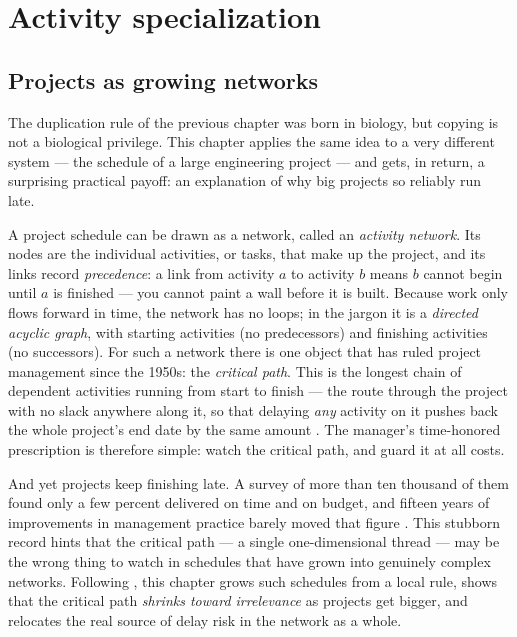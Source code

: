 \chapter{Activity specialization}
\label{ch:projects}

\section{Projects as growing networks}

The duplication rule of the previous chapter was born in biology, but copying is
not a biological privilege. This chapter applies the same idea to a very
different system --- the schedule of a large engineering project --- and gets, in
return, a surprising practical payoff: an explanation of why big projects so
reliably run late.

A project schedule can be drawn as a network, called an \emph{activity network}.
Its nodes are the individual activities, or tasks, that make up the project, and
its links record \emph{precedence}: a link from activity $a$ to activity $b$
means $b$ cannot begin until $a$ is finished --- you cannot paint a wall before it
is built. Because work only flows forward in time, the network has no loops; in
the jargon it is a \emph{directed acyclic graph}, with starting activities (no
predecessors) and finishing activities (no successors). For such a network there
is one object that has ruled project management since the 1950s: the
\emph{critical path}. This is the longest chain of dependent activities running
from start to finish --- the route through the project with no slack anywhere
along it, so that delaying \emph{any} activity on it pushes back the whole
project's end date by the same amount \citep{kelley1959}. The manager's
time-honored prescription is therefore simple: watch the critical path, and
guard it at all costs.

And yet projects keep finishing late. A survey of more than ten thousand of them
found only a few percent delivered on time and on budget, and fifteen years of
improvements in management practice barely moved that figure
\citep{flyvbjerg2003}. This stubborn record hints that the critical path --- a
single one-dimensional thread --- may be the wrong thing to watch in schedules
that have grown into genuinely complex networks. Following
\citet{vazquezprojects2023}, this chapter grows such schedules from a local rule,
shows that the critical path \emph{shrinks toward irrelevance} as projects get
bigger, and relocates the real source of delay risk in the network as a whole.

